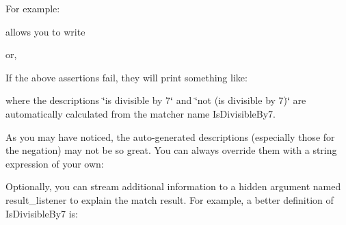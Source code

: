 For example\+: 
\begin{DoxyCode}{0}
\end{DoxyCode}
 allows you to write 
\begin{DoxyCode}{0}
\end{DoxyCode}
 or, 
\begin{DoxyCode}{0}
\end{DoxyCode}
 If the above assertions fail, they will print something like\+: 
\begin{DoxyCode}{0}
\end{DoxyCode}
 where the descriptions {\ttfamily \char`\"{}is divisible by 7\char`\"{}} and {\ttfamily \char`\"{}not (is divisible
by 7)\char`\"{}} are automatically calculated from the matcher name {\ttfamily Is\+Divisible\+By7}.

As you may have noticed, the auto-\/generated descriptions (especially those for the negation) may not be so great. You can always override them with a string expression of your own\+: 
\begin{DoxyCode}{0}
\DoxyCodeLine{\}}
\end{DoxyCode}


Optionally, you can stream additional information to a hidden argument named {\ttfamily result\+\_\+listener} to explain the match result. For example, a better definition of {\ttfamily Is\+Divisible\+By7} is\+: 
\begin{DoxyCode}{0}
\DoxyCodeLine{}
\DoxyCodeLine{\}}
\end{DoxyCode}



